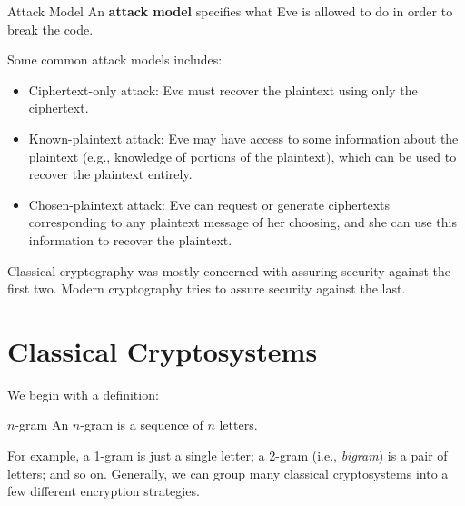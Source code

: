 \documentclass[letterpaper]{article}
\begin{document}
\begin{definition}{Attack Model}{}
    An \textbf{attack model} specifies what Eve is allowed to do in order to break the code. 
\end{definition}
Some common attack models includes:
\begin{itemize}
    \item Ciphertext-only attack: Eve must recover the plaintext using only the ciphertext.
    \item Known-plaintext attack: Eve may have access to some information about the plaintext (e.g., knowledge of portions of the plaintext), which can be used to recover the plaintext entirely. 
    \item Chosen-plaintext attack: Eve can request or generate ciphertexts corresponding to any plaintext message of her choosing, and she can use this information to recover the plaintext.
\end{itemize}
Classical cryptography was mostly concerned with assuring security against the first two. Modern cryptography tries to assure security against the last. 


\newpage 
\section{Classical Cryptosystems}
We begin with a definition: 
\begin{definition}{$n$-gram}{}
    An $n$-gram is a sequence of $n$ letters.
\end{definition}
For example, a 1-gram is just a single letter; a 2-gram (i.e., \emph{bigram}) is a pair of letters; and so on. Generally, we can group many classical cryptosystems into a few different encryption strategies.
\end{document}

